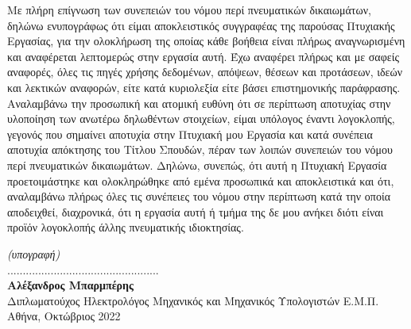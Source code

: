 \noindent
Με πλήρη επίγνωση των συνεπειών του νόμου περί πνευματικών δικαιωμάτων, δηλώνω ενυπογράφως
ότι είμαι αποκλειστικός συγγραφέας της παρούσας Πτυχιακής Εργασίας, για την ολοκλήρωση της οποίας
κάθε βοήθεια είναι πλήρως αναγνωρισμένη και αναφέρεται λεπτομερώς στην εργασία αυτή. Έχω
αναφέρει πλήρως και με σαφείς αναφορές, όλες τις πηγές χρήσης δεδομένων, απόψεων, θέσεων και
προτάσεων, ιδεών και λεκτικών αναφορών, είτε κατά κυριολεξία είτε βάσει επιστημονικής παράφρασης.
Αναλαμβάνω την προσωπική και ατομική ευθύνη ότι σε περίπτωση αποτυχίας στην υλοποίηση των
ανωτέρω δηλωθέντων στοιχείων, είμαι υπόλογος έναντι λογοκλοπής, γεγονός που σημαίνει αποτυχία
στην Πτυχιακή μου Εργασία και κατά συνέπεια αποτυχία απόκτησης του Τίτλου Σπουδών, πέραν των
λοιπών συνεπειών του νόμου περί πνευματικών δικαιωμάτων. Δηλώνω, συνεπώς, ότι αυτή η Πτυχιακή
Εργασία προετοιμάστηκε και ολοκληρώθηκε από εμένα προσωπικά και αποκλειστικά και ότι,
αναλαμβάνω πλήρως όλες τις συνέπειες του νόμου στην περίπτωση κατά την οποία αποδειχθεί,
διαχρονικά, ότι η εργασία αυτή ή τμήμα της δε μου ανήκει διότι είναι προϊόν λογοκλοπής άλλης
πνευματικής ιδιοκτησίας.
\vfill

\vspace{0.3cm}
\indent \indent \indent
\scriptsize{\textit{(υπογραφή)}}
\normalsize
\vspace{1.2cm}\\
\noindent
................................................. \\[10pt]
\textbf{Αλέξανδρος Μπαρμπέρης} \\
Διπλωματούχος Ηλεκτρολόγος Μηχανικός και Μηχανικός Υπολογιστών Ε.Μ.Π. \\[5pt]
\noindent
Αθήνα, Οκτώβριος 2022
